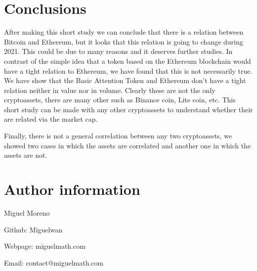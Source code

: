 \documentclass[11pt]{article}
\begin{document}
    \section{Conclusions}\label{conclusions}

After making this short study we can conclude that there is a relation
between Bitcoin and Ethereum, but it looks that this relation is going
to change during 2021. This could be due to many reasons and it deserves
further studies. In contrast of the simple idea that a token based on
the Ethereum blockchain would have a tight relation to Ethereum, we have
found that this is not necessarily true. We have show that the Basic
Attention Token and Ethereum don't have a tight relation neither in
value nor in volume. Clearly these are not the only cryptoassets, there
are many other such as Binance coin, Lite coin, etc. This short study
can be made with any other cryptoassets to understand whether their are
related via the market cap.

Finally, there is not a general correlation between any two
cryptoassets, we showed two cases in which the assets are correlated and
another one in which the assets are not.

\section{Author information}

Miguel Moreno

Github: Miguelwan

Webpage: miguelmath.com

Email: contact@miguelmath.com


    
    
    
    
\end{document}
